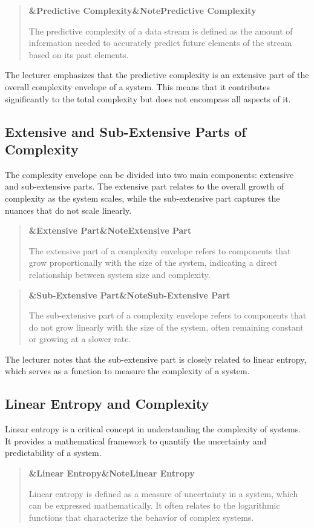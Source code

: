 \documentclass[a4paper]{article}
\newcommand{\boxheading}[1]{%
  \par\smallskip
  \noindent\textbf{\ifx&#1&Note\else#1\fi}\par
  \smallskip
}
\newenvironment{defbox}[1][]{%
  \begin{quote}\color{green!40!black}\boxheading{#1}\normalcolor
}{\end{quote}}
\begin{document}
\begin{defbox}[Predictive Complexity]
The predictive complexity of a data stream is defined as the amount of information needed to accurately predict future elements of the stream based on its past elements.
\end{defbox}

The lecturer emphasizes that the predictive complexity is an extensive part of the overall complexity envelope of a system. This means that it contributes significantly to the total complexity but does not encompass all aspects of it.

\subsection{Extensive and Sub-Extensive Parts of Complexity}
The complexity envelope can be divided into two main components: extensive and sub-extensive parts. The extensive part relates to the overall growth of complexity as the system scales, while the sub-extensive part captures the nuances that do not scale linearly.

\begin{defbox}[Extensive Part]
The extensive part of a complexity envelope refers to components that grow proportionally with the size of the system, indicating a direct relationship between system size and complexity.
\end{defbox}

\begin{defbox}[Sub-Extensive Part]
The sub-extensive part of a complexity envelope refers to components that do not grow linearly with the size of the system, often remaining constant or growing at a slower rate.
\end{defbox}

The lecturer notes that the sub-extensive part is closely related to linear entropy, which serves as a function to measure the complexity of a system.

\subsection{Linear Entropy and Complexity}
Linear entropy is a critical concept in understanding the complexity of systems. It provides a mathematical framework to quantify the uncertainty and predictability of a system.

\begin{defbox}[Linear Entropy]
Linear entropy is defined as a measure of uncertainty in a system, which can be expressed mathematically. It often relates to the logarithmic functions that characterize the behavior of complex systems.
\end{defbox}
\end{document}
